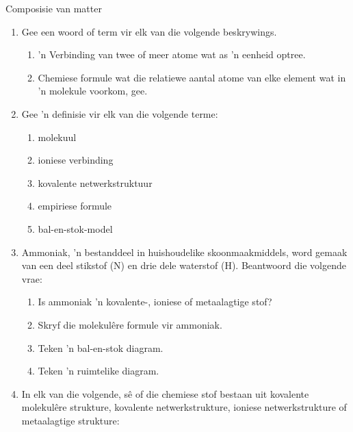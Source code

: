 \label{m38120*secfhsst!!!underscore!!!id497}
            \begin{eocexercises}{Composisie van matter}
            \nopagebreak
            \label{m38120*id311490}\begin{enumerate}[noitemsep, label=\textbf{\arabic*}. ] 
            \label{m38120*uid87}\item Gee een woord of term vir elk van die volgende beskrywings.
\label{m38120*id34411506}\begin{enumerate}[noitemsep, label=\textbf{\alph*}. ] 
            \label{m38120*uid90}\item 'n Verbinding van twee of meer atome wat as 'n eenheid optree.
\label{m38120*uid9221}\item Chemiese formule wat die relatiewe aantal atome van elke element wat in 'n molekule voorkom, gee.
\end{enumerate}
\label{m38120*uid227}\item Gee 'n definisie vir elk van die volgende terme: 
\label{m38120*id311506}\begin{enumerate}[noitemsep, label=\textbf{\alph*}. ] 
            \label{m38120*uid930}\item molekuul
\label{m38120*uid91}\item ioniese verbinding
\item kovalente netwerkstruktuur
\item empiriese formule
\item bal-en-stok-model\end{enumerate}
\label{m38120*uid92}\item Ammoniak, 'n bestanddeel in huishoudelike skoonmaakmiddels, word gemaak van een deel stikstof ($\text{N}$) en drie dele waterstof ($\text{H}$). Beantwoord die volgende vrae:
\label{m38120*id311590}\begin{enumerate}[noitemsep, label=\textbf{\alph*}. ] 
            \label{m38120*uid94}\item Is ammoniak 'n kovalente-, ioniese of metaalagtige stof?
\label{m38120*uid95}\item Skryf die molekul\^{e}re formule vir ammoniak.
\label{m38120*uid96}\item Teken 'n bal-en-stok diagram.
\label{m38120*uid97}\item Teken 'n ruimtelike diagram.
\end{enumerate}
            \label{m38120*uid11}\item In elk van die volgende, sê of die chemiese stof bestaan uit kovalente molekul\^{e}re strukture, kovalente netwerkstrukture, ioniese netwerkstrukture of metaalagtige strukture:

\end{enumerate}
\end{eocexercises}
